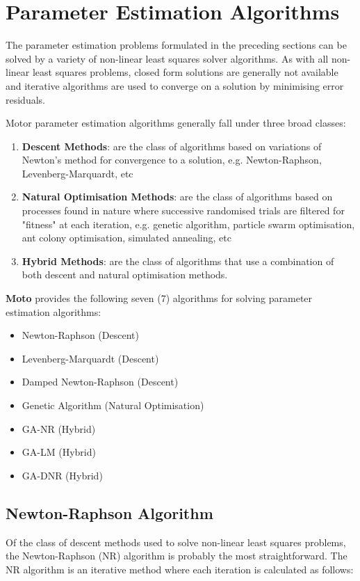 \documentclass{article}
\begin{document}
\section{Parameter Estimation Algorithms}
\label{sec:algorithms}

The parameter estimation problems formulated in the preceding sections can be solved by a variety of non-linear least squares solver algorithms. As with all non-linear least squares problems, closed form solutions are generally not available and iterative algorithms are used to converge on a solution by minimising error residuals.

Motor parameter estimation algorithms generally fall under three broad classes:
\begin{enumerate}
\item \textbf{Descent Methods}: are the class of algorithms based on variations of Newton's method for convergence to a solution, e.g. Newton-Raphson, Levenberg-Marquardt, etc
\item \textbf{Natural Optimisation Methods}: are the class of algorithms based on processes found in nature where successive randomised trials are filtered for "fitness" at each iteration, e.g. genetic algorithm, particle swarm optimisation, ant colony optimisation, simulated annealing, etc
\item \textbf{Hybrid Methods}: are the class of algorithms that use a combination of both descent and natural optimisation methods. 
\end{enumerate}

\textbf{Moto} provides the following seven (7) algorithms for solving parameter estimation algorithms:

\begin{itemize}
\item Newton-Raphson (Descent)
\item Levenberg-Marquardt (Descent)
\item Damped Newton-Raphson (Descent)
\item Genetic Algorithm (Natural Optimisation)
\item GA-NR (Hybrid)
\item GA-LM (Hybrid)
\item GA-DNR (Hybrid)
\end{itemize}

\subsection{Newton-Raphson Algorithm}
\label{sec:nr_algo}
Of the class of descent methods used to solve non-linear least squares problems, the Newton-Raphson (NR) algorithm is probably the most straightforward. The NR algorithm is an iterative method where each iteration is calculated as follows:
\end{document}
